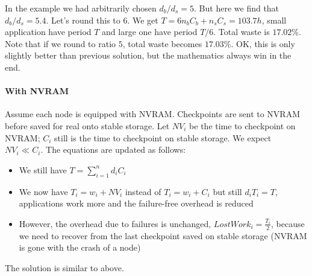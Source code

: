 \documentclass{article}
\begin{document}
In the example we had arbitrarily chosen $d_{b}/d_{s}=5$.
But here we find that $d_{b}/d_{s}=5.4$. Let's round this to $6$.
We get $T=6n_{b}C_{b}+n_{s}C_{s}=103.7h$, small application have period $T$
and large one have period $T/6$.  Total waste is $17.02\%$.
Note that if we round to ratio $5$, total waste becomes $17.03\%$.
OK, this is only slightly better than previous solution, but the mathematics 
 always win in the end.

\paragraph{With NVRAM}

Assume each node is equipped with NVRAM. Checkpoints are sent to NVRAM before
saved for real onto stable storage. Let $NV_{i}$ be the time to checkpoint on NVRAM; $C_{i}$
still is the time to checkpoint on stable storage. We expect $NV_{i} \ll C_{i}$.
The equations are updated as follows:
\begin{itemize}
\item We still have $T  = \sum_{i=1}^{n} d_{i} C_{i}$
\item  We now have $T_{i}= w_{i}+NV_{i}$ instead of $T_{i}= w_{i}+C_{i}$
but still $d_{i} T_{i}=T$, applications work more and the failure-free overhead is reduced
\item However, the overhead due to failures is unchanged, 
$LostWork_{i} = \frac{T_{i}}{2}$, 
because we need to recover from the last checkpoint saved on stable storage (NVRAM is gone with the crash of a node)
\end{itemize}
The solution is similar to above.
\end{document}
